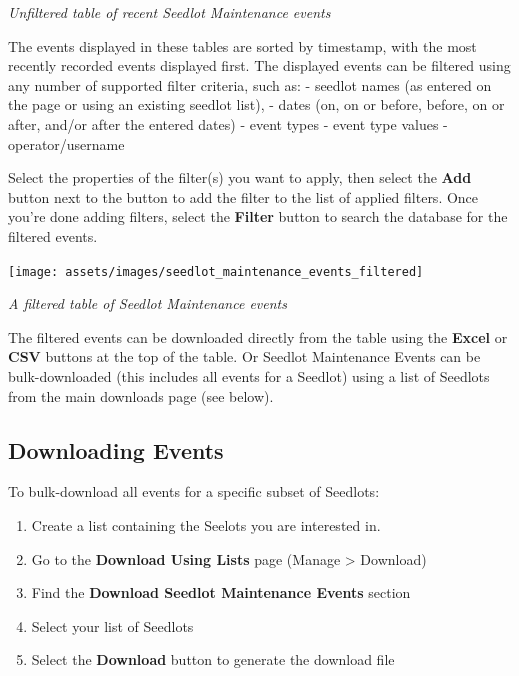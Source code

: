 \documentclass[
  12pt,
]{book}
\providecommand{\tightlist}{%
  \setlength{\itemsep}{0pt}\setlength{\parskip}{0pt}}
\begin{document}
\emph{Unfiltered table of recent Seedlot Maintenance events}

The events displayed in these tables are sorted by timestamp, with the most recently recorded events displayed first. The displayed events can be filtered using any number of supported filter criteria, such as: - seedlot names (as entered on the page or using an existing seedlot list), - dates (on, on or before, before, on or after, and/or after the entered dates) - event types - event type values - operator/username

Select the properties of the filter(s) you want to apply, then select the \textbf{Add} button next to the button to add the filter to the list of applied filters. Once you're done adding filters, select the \textbf{Filter} button to search the database for the filtered events.

\begin{center}\texttt{[image: assets/images/seedlot\_maintenance\_events\_filtered]} \end{center}

\emph{A filtered table of Seedlot Maintenance events}

The filtered events can be downloaded directly from the table using the \textbf{Excel} or \textbf{CSV} buttons at the top of the table. Or Seedlot Maintenance Events can be bulk-downloaded (this includes all events for a Seedlot) using a list of Seedlots from the main downloads page (see below).

\hypertarget{downloading-events}{%
\subsection{Downloading Events}\label{downloading-events}}

To bulk-download all events for a specific subset of Seedlots:

\begin{enumerate}
\def\labelenumi{\arabic{enumi}.}
\tightlist
\item
  Create a list containing the Seelots you are interested in.
\item
  Go to the \textbf{Download Using Lists} page (Manage \textgreater{} Download)
\item
  Find the \textbf{Download Seedlot Maintenance Events} section
\item
  Select your list of Seedlots
\item
  Select the \textbf{Download} button to generate the download file
\end{enumerate}
\end{document}
